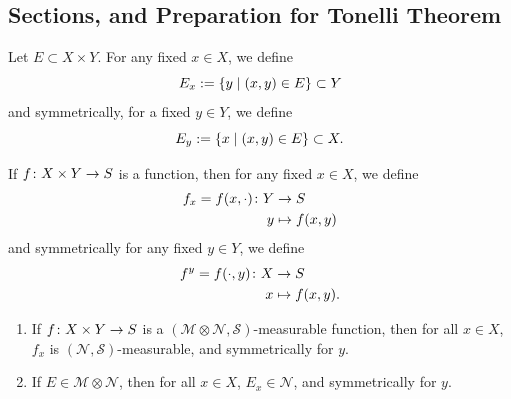\documentclass[11pt,leqno,oneside]{amsbook}
\numberwithin{thm}{section}
\newcommand{\M}{\mathcal{M}}
\newcommand{\cN}{\mathcal{N}}
\newcommand{\cS}{\mathcal{S}}
\newcommand{\x}{\times}
\newcommand{\ox}{\otimes}
\begin{document}
\subsection*{Sections, and Preparation for Tonelli Theorem}
\begin{defn}
  Let $E \subset X \x Y$.  For any fixed $x \in X$, we define $$E_x := \{y \mid (x,y) \in E\} \subset Y$$ and symmetrically, for a fixed $y \in Y$, we define $$E_y := \{x \mid (x,y) \in E\} \subset X.$$
\end{defn}
\begin{defn}
  If $f \from X \x Y \to S$ is a function, then for any fixed $x \in X$, we define
  \begin{align*}
    f_x = f(x, \cdot) \colon Y &\to S \\
    y &\mapsto f(x,y)
  \end{align*}
  and symmetrically for any fixed $y \in Y$, we define
  \begin{align*}
    f^y = f(\cdot, y) \colon X &\to S \\
    x &\mapsto f(x,y).
  \end{align*}
\end{defn}
\begin{prop}
  \mbox{}
  \begin{enumerate}[label=(\arabic{*})]
    \item If $f \from X \x Y \to S$ is a $(\M \ox \cN, \cS)$-measurable function, then for all $x \in X$, $f_x$ is $(\cN, \cS)$-measurable, and symmetrically for $y$.
    \item If $E \in \M \ox \cN$, then for all $x \in X$, $E_x \in \cN$, and symmetrically for $y$.
  \end{enumerate}
\end{prop}
\end{document}
